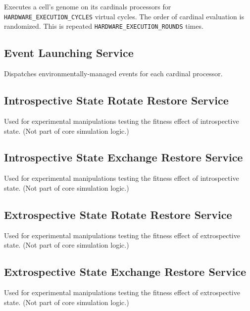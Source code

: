 Executes a cell's genome on its cardinals processors for \texttt{HARDWARE\_EXECUTION\_CYCLES} virtual cycles.
The order of cardinal evaluation is randomized.
This is repeated \texttt{HARDWARE\_EXECUTION\_ROUNDS} times.

\subsection{Event Launching Service}


Dispatches environmentally-managed events for each cardinal processor.

\subsection{Introspective State Rotate Restore Service}


Used for experimental manipulations testing the fitness effect of introspective state.
(Not part of core simulation logic.)

\subsection{Introspective State Exchange Restore Service}


Used for experimental manipulations testing the fitness effect of introspective state.
(Not part of core simulation logic.)

\subsection{Extrospective State Rotate Restore Service}


Used for experimental manipulations testing the fitness effect of extrospective state.
(Not part of core simulation logic.)

\subsection{Extrospective State Exchange Restore Service}


Used for experimental manipulations testing the fitness effect of extrospective state.
(Not part of core simulation logic.)


